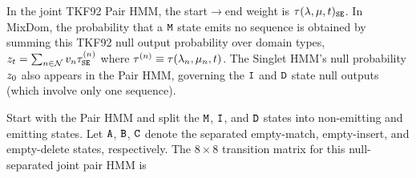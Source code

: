 In the joint TKF92 Pair HMM,
the start$\to$end weight is $\tau(\lambda,\mu,t)_{{\tt S}{\tt E}}$.
In MixDom, the probability that a ${\tt M}$ state emits no sequence is obtained by summing this TKF92 null output probability over domain types,
$z_t = \sum_{n \in \mathcal{N}} v_n \tau^{(n)}_{{\tt S}{\tt E}}$ where $\tau^{(n)} \equiv \tau(\lambda_n,\mu_n,t)$.
The Singlet HMM's null probability $z_0$ also appears in the Pair HMM,
governing the ${\tt I}$ and ${\tt D}$ state null outputs (which involve only one sequence).

Start with the Pair HMM and split the ${\tt M}$, ${\tt I}$, and ${\tt D}$ states into non-emitting and emitting states.
Let ${\tt A}$, ${\tt B}$, ${\tt C}$ denote the separated empty-match, empty-insert, and empty-delete states, respectively.
The $8 \times 8$ transition matrix for this null-separated joint pair HMM is
